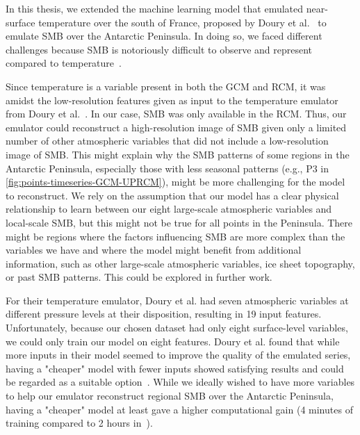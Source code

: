 \documentclass[a4paper,11pt,oneside]{report}
\begin{document}
In this thesis, we extended the machine learning model that emulated near-surface temperature over the south of France, proposed by Doury et al.~\cite{Doury} to emulate SMB over the Antarctic Peninsula. In doing so, we faced different challenges because SMB is notoriously difficult to observe and represent compared to temperature~\cite{Lenaerts2019}. 


Since temperature is a variable present in both the GCM and RCM, it was amidst the low-resolution features given as input to the temperature emulator from Doury et al.~\cite{Doury}. In our case, SMB was only available in the RCM. Thus, our emulator could reconstruct a high-resolution image of SMB given only a limited number of other atmospheric variables that did not include a low-resolution image of SMB. This might explain why the SMB patterns of some regions in the Antarctic Peninsula, especially those with less seasonal patterns (e.g., P3 in \autoref{fig:points-timeseries-GCM-UPRCM}), might be more challenging for the model to reconstruct. We rely on the assumption that our model has a clear physical relationship to learn between our eight large-scale atmospheric variables and local-scale SMB, but this might not be true for all points in the Peninsula. There might be regions where the factors influencing SMB are more complex than the variables we have and where the model might benefit from additional information, such as other large-scale atmospheric variables, ice sheet topography, or past SMB patterns. This could be explored in further work.


For their temperature emulator, Doury et al. had seven atmospheric variables at different pressure levels at their disposition, resulting in 19 input features. Unfortunately, because our chosen dataset had only eight surface-level variables, we could only train our model on eight features. Doury et al. found that while more inputs in their model seemed to improve the quality of the emulated series, having a "cheaper" model with fewer inputs showed satisfying results and could be regarded as a suitable option~\cite{Doury}. While we ideally wished to have more variables to help our emulator reconstruct regional SMB over the Antarctic Peninsula, having a "cheaper" model at least gave a higher computational gain (4 minutes of training compared to 2 hours in~\cite{Doury}).  
\end{document}
